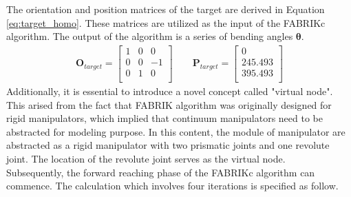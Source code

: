 \noindent The orientation and position matrices of the target are derived in Equation 
\ref{eq:target_homo}. These matrices are utilized as the input of the FABRIKc algorithm. The output of the algorithm 
is a series of bending angles $\boldsymbol{\theta}$.
\begin{align}
    \textbf{O}_{target} = 
    \begin{bmatrix}
        1 & 0 & 0 \\
        0 & 0 & -1 \\
        0 & 1 & 0 \\
    \end{bmatrix} 
    \qquad
    \textbf{P}_{target} = 
    \begin{bmatrix}
        0 \\
        245.493 \\
        395.493 \\
    \end{bmatrix} 
    \label{eq:target_homo} 
\end{align}
Additionally, it is essential to introduce a novel concept called "virtual node". This arised from the fact that FABRIK 
algorithm was originally designed for rigid manipulators, which implied that continuum manipulators need to be abstracted 
for modeling purpose. In this content, the module of manipulator are abstracted as a rigid manipulator with two prismatic 
joints and one revolute joint. The location of the revolute joint serves as the virtual node. \\
Subsequently, the forward reaching phase of the FABRIKc algorithm can commence. The calculation which involves four 
iterations is specified as follow.
